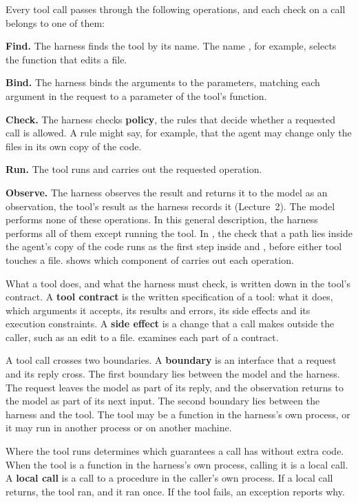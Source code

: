 Every tool call passes through the following operations, and each check on a call belongs to one of
them:
\be
\item \textbf{Find.} The harness finds the tool by its name. The name , for example,
selects the function that edits a file.
\item \textbf{Bind.} The harness binds the arguments to the parameters, matching each argument in
the request to a parameter of the tool's function.
\item \textbf{Check.} The harness checks \textbf{policy}, the rules that decide whether a requested
call is allowed. A rule might say, for example, that the agent may change only the files in its own
copy of the code.
\item \textbf{Run.} The tool runs and carries out the requested operation.
\item \textbf{Observe.} The harness observes the result and returns it to the model as an
observation, the tool's result as the harness records it (Lecture~2).
\ee
The model performs none of these operations. In this general description, the harness performs all
of them except running the tool. In \msa{}, the check that a path lies inside the agent's copy of
the code runs as the first step inside  and , before either tool
touches a file.  shows which component of \msa{} carries out each operation.

What a tool does, and what the harness must check, is written down in the tool's contract. A
\textbf{tool contract} is the written specification of a tool: what it does, which arguments it
accepts, its results and errors, its side effects and its execution constraints. A \textbf{side
effect} is a change that a call makes outside the caller, such as an edit to a file.
 examines each part of a contract.

A tool call crosses two boundaries. A \textbf{boundary} is an interface that a request and its reply
cross. The first boundary lies between the model and the harness. The request leaves the model as
part of its reply, and the observation returns to the model as part of its next input. The second
boundary lies between the harness and the tool. The tool may be a function in the harness's own
process, or it may run in another process or on another machine.

Where the tool runs determines which guarantees a call has without extra code. When the tool is a
function in the harness's own process, calling it is a local call. A \textbf{local call} is a call
to a procedure in the caller's own process. If a local call returns, the tool ran, and it ran once.
If the tool fails, an exception reports why.


